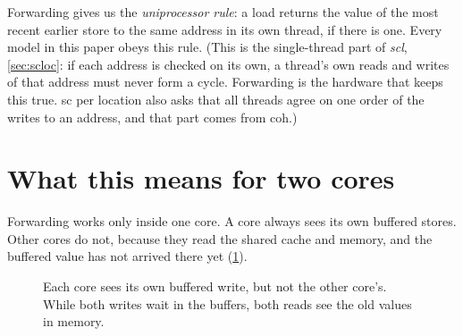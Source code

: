 Forwarding gives us the \emph{uniprocessor rule}: a load returns the value of the most recent earlier store to the same address in its own thread, if there is one. Every model in this paper obeys this rule. (This is the single-thread part of \emph{\gls{scl}}, \cref{sec:scloc}: if each address is checked on its own, a thread's own reads and writes of that address must never form a cycle. Forwarding is the hardware that keeps this true. \gls{sc} per location also asks that all threads agree on one order of the writes to an address, and that part comes from \gls{coh}.)

\section{What this means for two cores}
\label{sec:twocores}

Forwarding works only inside one core. A core always sees its own buffered stores. Other cores do not, because they read the shared cache and memory, and the buffered value has not arrived there yet (\cref{fig:twocores}).

\begin{figure}[!htbp]
\centering
{}
\caption{Each core sees its own buffered write, but not the other core's. While both writes wait in the buffers, both reads see the old values in memory.}
\label{fig:twocores}
\end{figure}

